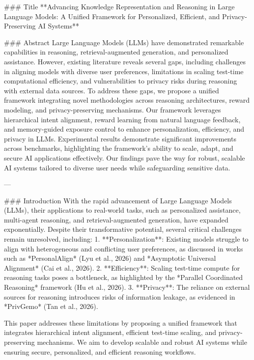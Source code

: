 ### Title  
**Advancing Knowledge Representation and Reasoning in Large Language Models: A Unified Framework for Personalized, Efficient, and Privacy-Preserving AI Systems**

### Abstract  
Large Language Models (LLMs) have demonstrated remarkable capabilities in reasoning, retrieval-augmented generation, and personalized assistance. However, existing literature reveals several gaps, including challenges in aligning models with diverse user preferences, limitations in scaling test-time computational efficiency, and vulnerabilities to privacy risks during reasoning with external data sources. To address these gaps, we propose a unified framework integrating novel methodologies across reasoning architectures, reward modeling, and privacy-preserving mechanisms. Our framework leverages hierarchical intent alignment, reward learning from natural language feedback, and memory-guided exposure control to enhance personalization, efficiency, and privacy in LLMs. Experimental results demonstrate significant improvements across benchmarks, highlighting the framework's ability to scale, adapt, and secure AI applications effectively. Our findings pave the way for robust, scalable AI systems tailored to diverse user needs while safeguarding sensitive data.

---

### Introduction  
With the rapid advancement of Large Language Models (LLMs), their applications to real-world tasks, such as personalized assistance, multi-agent reasoning, and retrieval-augmented generation, have expanded exponentially. Despite their transformative potential, several critical challenges remain unresolved, including:  
1. **Personalization**: Existing models struggle to align with heterogeneous and conflicting user preferences, as discussed in works such as *PersonalAlign* (Lyu et al., 2026) and *Asymptotic Universal Alignment* (Cai et al., 2026).  
2. **Efficiency**: Scaling test-time compute for reasoning tasks poses a bottleneck, as highlighted by the *Parallel Coordinated Reasoning* framework (Hu et al., 2026).  
3. **Privacy**: The reliance on external sources for reasoning introduces risks of information leakage, as evidenced in *PrivGemo* (Tan et al., 2026).  

This paper addresses these limitations by proposing a unified framework that integrates hierarchical intent alignment, efficient test-time scaling, and privacy-preserving mechanisms. We aim to develop scalable and robust AI systems while ensuring secure, personalized, and efficient reasoning workflows.

